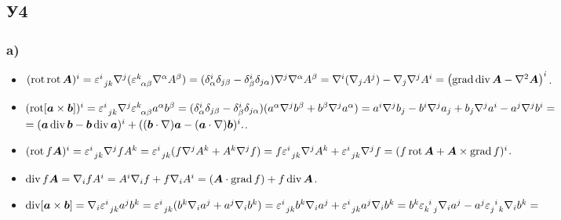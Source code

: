 \subsection*{У4}
\subsubsection*{a)}
\begin{itemize}
	\item $(\mathop{\mathrm{rot}}\nolimits \mathop{\mathrm{rot}}\nolimits \mbox{\boldmath $A$})^i 
	= 
	\varepsilon_{\phantom{0} j k}^{i} \nabla^j (\varepsilon_{\phantom{0} \alpha \beta}^{k} \nabla^\alpha A^\beta)
	=
	(\delta_{\alpha}^{i} \delta_{j \beta} - \delta_{\beta}^{i} \delta_{j \alpha}) \nabla^j \nabla^\alpha A^\beta
	=
	\nabla^i (\nabla_j A^j) - \nabla_j \nabla^j A^i
	=
	\left(
	\mathop{\mathrm{grad}}\nolimits \mathop{\mathrm{div}}\nolimits \mbox{\boldmath $A$} - \nabla^2 \mbox{\boldmath $A$}
	\right)^i$.

	\item $(\mathop{\mathrm{rot}}\nolimits [\mbox{\boldmath $a$} \times \mbox{\boldmath $b$}])^i 
	=
	\varepsilon_{\phantom{0} j k}^{i} \nabla^j \varepsilon_{\phantom{0} \alpha \beta}^{k} a^\alpha b^\beta
	=
	(\delta_{\alpha}^{i} \delta_{j \beta} - \delta_{\beta}^{i} \delta_{j \alpha})(a^\alpha \nabla^j b^\beta + b^\beta \nabla^j a^\alpha)
	= a^i \nabla^j b_j - b^i \nabla^j a_j + b_j \nabla^j a^i - a^j \nabla^j b^i =
	$
	\\
	\phantom{$(\rot [\vc{a} \times \vc{b}])^i$} $= (\mbox{\boldmath $a$} \mathop{\mathrm{div}}\nolimits \mbox{\boldmath $b$} - \mbox{\boldmath $b$} \mathop{\mathrm{div}}\nolimits \mbox{\boldmath $a$})^i
	+ ((\mbox{\boldmath $b$} \cdot \nabla) \mbox{\boldmath $a$}-(\mbox{\boldmath $a$} \cdot \nabla) \mbox{\boldmath $b$})^i.
	$.


	\item $(\mathop{\mathrm{rot}}\nolimits f \mbox{\boldmath $A$})^i
	=
	\varepsilon_{\phantom{0} j k}^{i} \nabla^j f A^k = \varepsilon_{\phantom{0} j k}^{i} (f \nabla^j A^k + A^k \nabla^j f)
	=
	f \varepsilon_{\phantom{0} j k}^{i} \nabla^j A^k + \varepsilon_{\phantom{0} j k}^{i} \nabla^j f
	=
	(f \mathop{\mathrm{rot}}\nolimits \mbox{\boldmath $A$} + \mbox{\boldmath $A$} \times \mathop{\mathrm{grad}}\nolimits f)^i$.

	\item $\mathop{\mathrm{div}}\nolimits f \mbox{\boldmath $A$} = \nabla_i f A^i = A^i \nabla_i f + f \nabla_i A^i
	=
	(\mbox{\boldmath $A$} \cdot \mathop{\mathrm{grad}}\nolimits f) + f \mathop{\mathrm{div}}\nolimits \mbox{\boldmath $A$}$.

	\item $\mathop{\mathrm{div}}\nolimits [\mbox{\boldmath $a$} \times \mbox{\boldmath $b$}] = \nabla_i \varepsilon_{\phantom{0} j k}^{i} a^j b^k = \varepsilon_{\phantom{0} j k}^{i} (b^k \nabla_i a^j + a^j \nabla_i b^k)
	=
	\varepsilon_{\phantom{0} j k}^{i} b^k \nabla_i a^j + \varepsilon_{\phantom{0} j k}^{i} a^j \nabla_i b^k
	=
	b^k \varepsilon_{k \phantom{0} j}^{ \phantom{0} i} \nabla_i a^j - a^j \varepsilon_{j \phantom{0} k}^{\phantom{0} i} \nabla_i b^k
	=$
	

\end{itemize}
